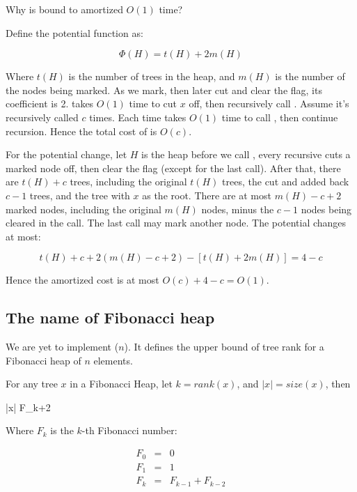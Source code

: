 \documentclass[b5paper]{article}
\begin{document}
\begin{Answer}[ref = {ex:fibo-heap-decrease}]
Why is  bound to amortized $O(1)$ time?

Define the potential function as:

\[
\Phi(H) = t(H) + 2m(H)
\]

Where $t(H)$ is the number of trees in the heap, and $m(H)$ is the number of the nodes being marked. As we mark, then later cut and clear the flag, its coefficient is 2.  takes $O(1)$ time to cut $x$ off, then recursively call . Assume it's recursively called $c$ times. Each time takes $O(1)$ time to call , then continue recursion. Hence the total cost of  is $O(c)$.

For the potential change, let $H$ is the heap before we call , every recursive  cuts a marked node off, then clear the flag (except for the last call). After that, there are $t(H) + c$ trees, including the original $t(H)$ trees, the cut and added back $c - 1$ trees, and the tree with $x$ as the root. There are at most $m(H) - c + 2$ marked nodes, including the original $m(H)$ nodes, minus the $c - 1$ nodes being cleared in the  call. The last call may mark another node. The potential changes at most:

\[
t(H) + c + 2(m(H) - c + 2) - [t(H) + 2m(H)] = 4 - c
\]

Hence the amortized cost is at most $O(c) + 4 - c = O(1)$.
\end{Answer}

\subsection{The name of Fibonacci heap}

We are yet to implement ($n$). It defines the upper bound of tree rank for a Fibonacci heap of $n$ elements.

\begin{lemma}
\label{lemma:Fib-degree}
For any tree $x$ in a Fibonacci Heap, let $k = rank(x)$, and $|x| = size(x)$, then

\be
  |x| \geq F_{k+2}
\ee

Where $F_k$ is the $k$-th Fibonacci number:

\[
\begin{array}{rcl}
F_0 & = & 0 \\
F_1 & = & 1 \\
F_k & = & F_{k-1} + F_{k-2} \\
\end{array}
\]
\end{lemma}
\end{document}

